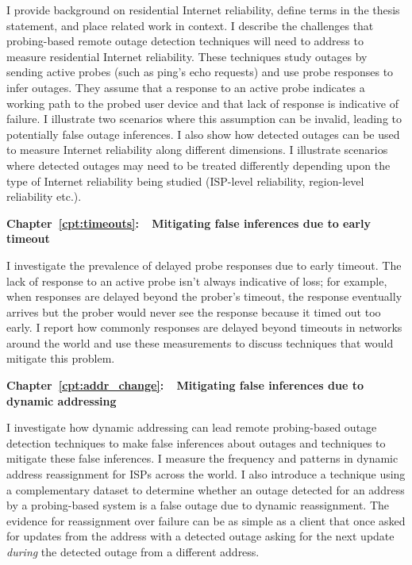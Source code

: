 I provide background on residential
Internet reliability, define terms in the thesis statement, and place
related work in context. I describe the challenges that probing-based
remote outage detection techniques will need to address to measure
residential Internet reliability. These techniques study outages by
sending active probes (such as ping's echo requests) and use probe
responses to infer outages. They assume that a response to an active
probe indicates a working path to the probed user device and that lack
of response is indicative of failure. I illustrate two scenarios where
this assumption can be invalid, leading to potentially false outage
inferences. I also show how detected outages can be used to measure
Internet reliability along different dimensions. I illustrate
scenarios where detected outages may
need to be treated differently depending upon the type of
Internet reliability being studied (ISP-level reliability,
region-level reliability etc.).

\textbf{Chapter~\ref{cpt:timeouts}:~~Mitigating false inferences due
to early timeout} 

I investigate the
prevalence of delayed probe responses due to early timeout. The lack
of response to an active probe isn't always indicative of loss; for
example, when responses are delayed beyond the prober's timeout, the
response eventually arrives but the prober would never see the
response because it timed out too early. I report how commonly
responses are delayed beyond timeouts in networks around the world and
use these measurements to discuss techniques that would mitigate this problem.

\textbf{Chapter~\ref{cpt:addr_change}:~~Mitigating false inferences due to dynamic addressing} 

I investigate how dynamic addressing can lead remote probing-based
outage detection techniques to make false inferences about outages and
techniques to mitigate these false inferences. I measure the frequency
and patterns in dynamic address reassignment for ISPs across the
world.  I also introduce a technique using a complementary dataset to
determine whether an outage detected for an address by a probing-based
system is a false outage due to dynamic reassignment. The evidence for
reassignment over failure can be as simple as a client that once asked
for updates from the address with a detected outage asking for the
next update \emph{during} the detected outage from a different address.

